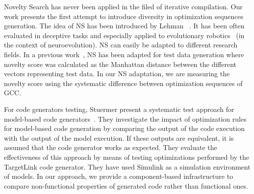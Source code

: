 Novelty Search has never been applied in the filed of iterative compilation. Our work presents the first attempt to introduce diversity in optimization sequences generation. The idea of NS has been introduced by Lehman \etal~\cite{lehman2008exploiting}. It has been often evaluated in deceptive tasks and especially applied to evolutionary robotics~\cite{risi2010evolving,krvcah2012solving} (in the context of neuroevolution). 
NS can easily be adapted to different research fields. In a previous work~\cite{boussaa2015novelty}, NS has been adapted for test data generation where novelty score was calculated as the Manhattan distance between the different vectors representing test data.
In our NS adaptation, we are measuring the novelty score using the systematic difference between optimization sequences of GCC.

For code generators testing, Stuermer \etal present a systematic test approach for model-based code generators~\cite{stuermer2007systematic}. They investigate the impact of optimization rules for model-based code generation by comparing the output of the code execution with the output of the model execution. 
If these outputs are equivalent, it is assumed that the code generator works as expected. 
They evaluate the effectiveness of this approach by means of testing optimizations performed by the TargetLink code generator. 
They have used Simulink as a simulation environment of models. 
In our approach, we provide a component-based infrastructure to compare non-functional properties of generated code rather than functional ones. 
\fi
